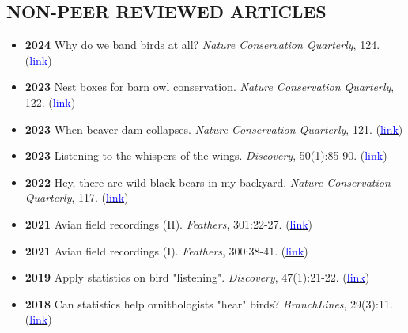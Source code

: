 \documentclass[11pt,letterpaper,sans]{moderncv}        %
\begin{document}
\subsection{NON-PEER REVIEWED ARTICLES}
\begin{itemize}

\item{\textbf{2024} Why do we band birds at all? \textit{Nature Conservation Quarterly}}, 124. (\href{}{\textcolor{blue}{link}})
\vspace{3pt}

\item{\textbf{2023} Nest boxes for barn owl conservation. \textit{Nature Conservation Quarterly}}, 122. (\href{https://github.com/SunnyTseng/sunny_cv/blob/main/2023-07-03_1336134904.pdf}{\textcolor{blue}{link}})
\vspace{3pt}

\item{\textbf{2023} When beaver dam collapses. \textit{Nature Conservation Quarterly}}, 121. (\href{https://github.com/SunnyTseng/sunny_cv/blob/main/2023-04-17_0744599592.pdf}{\textcolor{blue}{link}})
\vspace{3pt}

\item{\textbf{2023} Listening to the whispers of the wings. \textit{Discovery}}, 50(1):85-90. (\href{https://drive.google.com/file/d/1dJVMvOMULfuDzc_YATCUpOdxOxK6YwaX/view?usp=share_link}{\textcolor{blue}{link}})
\vspace{3pt}


\item{\textbf{2022} Hey, there are wild black bears in my backyard. \textit{Nature Conservation Quarterly}}, 117. (\href{https://github.com/SunnyTseng/sunny_cv/blob/main/2022-03-31_1337080532.pdf}{\textcolor{blue}{link}})
\vspace{3pt}

\item{\textbf{2021} Avian field recordings (II). \textit{Feathers}}, 301:22-27. (\href{https://www.bird.org.tw/feather}{\textcolor{blue}{link}})
\vspace{3pt}

\item{\textbf{2021} Avian field recordings (I). \textit{Feathers}}, 300:38-41. (\href{https://www.bird.org.tw/feather}{\textcolor{blue}{link}})
\vspace{3pt}

\item{\textbf{2019} Apply statistics on bird "listening". \textit{Discovery}}, 47(1):21-22. (\href{https://drive.google.com/open?id=1lZC8H246lFH-XCGI6vtBjXMIq1YqukUG}{\textcolor{blue}{link}})
\vspace{3pt}

\item{\textbf{2018} Can statistics help ornithologists "hear" birds? \textit{BranchLines}}, 29(3):11. (\href{https://forestry.ubc.ca/files/2019/04/bl-29.3.pdf#page=11}{\textcolor{blue}{link}}) 
\vspace{3pt}

\end{itemize}
\end{document}
